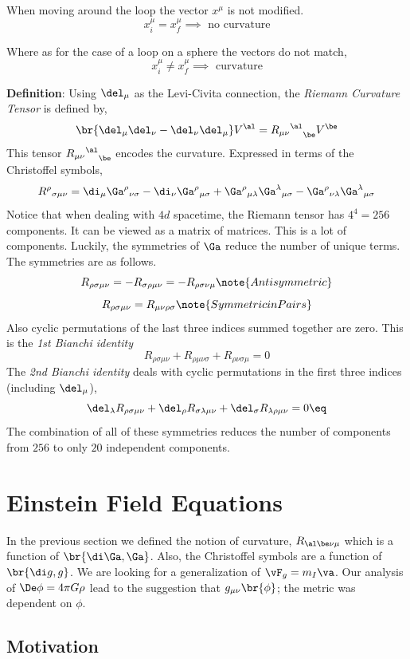 \documentclass{article}
\begin{document}
When moving around the loop the vector $x^\mu$ is not modified.
\[ x^\mu_i = x^\mu_f \implies \text{ no curvature} \]

Where as for the case of a loop on a sphere the vectors do not match,
\[ x^\mu_i \neq x^\mu_f \implies \text{ curvature} \]

\textbf{Definition}: Using $\del_\mu$ as the Levi-Civita connection, the \textit{Riemann Curvature Tensor} is defined by,
\[ \br{\del_\mu \del_\nu - \del_\nu \del_\mu} V^\al = {{R_{\mu\nu}}^\al}_\be V^\be \]
This tensor ${{R_{\mu\nu}}^\al}_\be$ encodes the curvature. Expressed in terms of the Christoffel symbols,
\[ {R^{\rho}}_{\sigma \mu \nu} = \di_\mu {\Ga^\rho}_{\nu\sigma}- \di_\nu {\Ga^\rho}_{\mu\sigma} + {\Ga^\rho}_{\mu\lambda}{\Ga^\lambda}_{\mu\sigma} - {\Ga^\rho}_{\nu\lambda}{\Ga^\lambda}_{\mu\sigma} \]
Notice that when dealing with $4d$ spacetime, the Riemann tensor has $4^4 = 256$ components. It can be viewed as a matrix of matrices. This is a lot of components. Luckily, the symmetries of $\Ga$ reduce the number of unique terms. The symmetries are as follows.
\[ R_{\rho \sigma \mu \nu} = - R_{\sigma \rho \mu \nu} = - R_{\rho \sigma \nu \mu} \note{Antisymmetric} \]
\[ R_{\rho \sigma \mu \nu} = R_{\mu \nu \rho \sigma } \note{Symmetric in Pairs} \]
Also cyclic permutations of the last three indices summed together are zero. This is the \textit{1st Bianchi identity}
\[ R_{\rho \sigma \mu \nu} + R_{\rho  \mu \nu\sigma} + R_{\rho  \nu\sigma \mu} = 0 \]
The \textit{2nd Bianchi identity} deals with cyclic permutations in the first three indices (including $\del_\mu$),
\[ \del_\lambda R_{\rho \sigma \mu \nu} + \del_\rho R_{ \sigma\lambda \mu \nu} + \del_\sigma R_{\lambda\rho  \mu \nu} = 0 \eq \label{eq:2ndbi}\]
The combination of all of these symmetries reduces the number of components from $256$ to only $20$ independent components.

\section{Einstein Field Equations}

In the previous section we defined the notion of curvature, $R_{\al\be\nu\mu}$ which is a function of $\br{\di \Ga , \Ga}$. Also, the Christoffel symbols are a function of $\br{\di g, g}$. We are looking for a generalization of $\vF_g = m_I \va$. Our analysis of $\De \phi = 4 \pi G \rho$ lead to the suggestion that $g_{\mu\nu}\br{\phi}$; the metric was dependent on $\phi$.

\subsection{Motivation}
\end{document}
